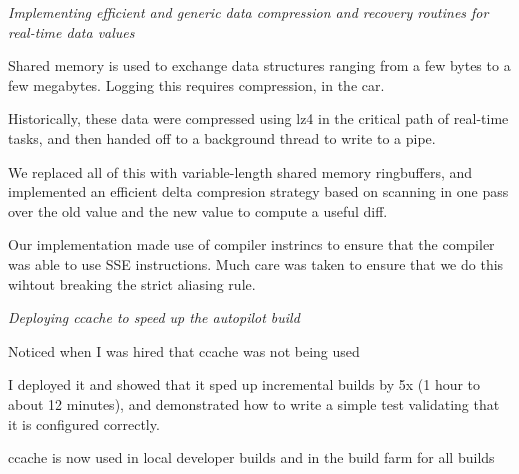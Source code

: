 \documentclass[margin,line]{resume}
\begin{document}
\begin{resume}
\newpage

    \textsl{Implementing efficient and generic data compression and recovery routines for real-time data values}
    \begin{list2}
    \item{Shared memory is used to exchange data structures ranging from a few bytes to a few megabytes. Logging this requires compression, in the car.}
    \item{Historically, these data were compressed using lz4
    in the critical path of real-time tasks, and then handed off to a background thread to write to a pipe.}
    \item{We replaced all of this with variable-length shared memory ringbuffers, and implemented an efficient delta compresion
    strategy based on scanning in one pass over the old value and the new value to compute a useful diff.}
    \item{Our implementation made use of compiler instrincs
    to ensure that the compiler was able to use SSE instructions. Much care was taken to ensure that we do this wihtout
    breaking the strict aliasing rule.}
    \end{list2}
    
    \textsl{Deploying ccache to speed up the autopilot build}
    \begin{list2}
    \item{Noticed when I was hired that ccache was not being used}
    \item{I deployed it and showed that it sped up incremental builds by 5x (1 hour to about 12 minutes), and demonstrated how to write a simple test validating that it is configured correctly.}
    \item{ccache is now used in local developer builds and in the build farm for all builds}
    \end{list2}



\end{resume}
\end{document}
